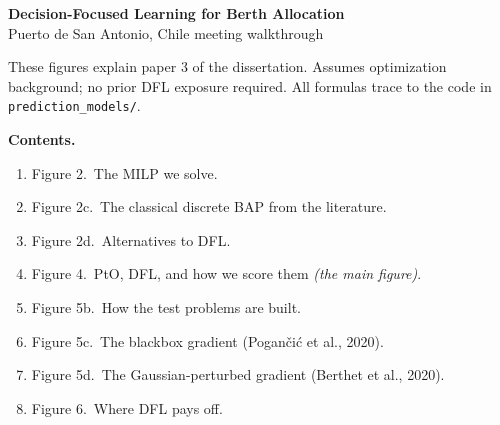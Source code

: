 \documentclass[11pt]{article}
\begin{document}
\begin{center}
\end{center}

\begin{center}
{\Large\bfseries Decision-Focused Learning for Berth Allocation}\\[4pt]
{\small Puerto de San Antonio, Chile \;\textbar\;
        meeting walkthrough}
\end{center}

\vspace{0.6em}

\noindent
These figures explain paper 3 of the dissertation.  Assumes
optimization background; no prior DFL exposure required.  All formulas
trace to the code in \texttt{prediction\_models/}.

\vspace{1em}

\noindent\textbf{Contents.}
\begin{enumerate}[leftmargin=2em, itemsep=0pt]
  \item Figure 2.\ The MILP we solve.
  \item Figure 2c.\ The classical discrete BAP from the literature.
  \item Figure 2d.\ Alternatives to DFL.
  \item Figure 4.\ PtO, DFL, and how we score them \emph{(the main figure)}.
  \item Figure 5b.\ How the test problems are built.
  \item Figure 5c.\ The blackbox gradient (Pogan\v{c}i\'c et al., 2020).
  \item Figure 5d.\ The Gaussian-perturbed gradient (Berthet et al., 2020).
  \item Figure 6.\ Where DFL pays off.
\end{enumerate}
\end{document}
